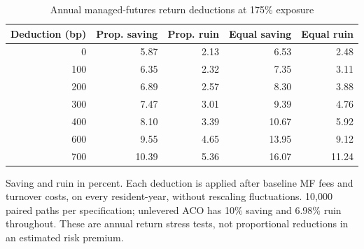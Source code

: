 \begin{table}[htbp]\centering\small
\caption{Annual managed-futures return deductions at 175\% exposure}\label{tab:review-mf}
\begin{tabular}{rrrrr}\toprule
Deduction (bp) & Prop. saving & Prop. ruin & Equal saving & Equal ruin \\
\midrule
0 & 5.87 & 2.13 & 6.53 & 2.48 \\
100 & 6.35 & 2.32 & 7.35 & 3.11 \\
200 & 6.89 & 2.57 & 8.30 & 3.88 \\
300 & 7.47 & 3.01 & 9.39 & 4.76 \\
400 & 8.10 & 3.39 & 10.67 & 5.92 \\
600 & 9.55 & 4.65 & 13.95 & 9.12 \\
700 & 10.39 & 5.36 & 16.07 & 11.24 \\
\bottomrule\end{tabular}
\par\smallskip\begin{minipage}{0.96\textwidth}\footnotesize
Saving and ruin in percent. Each deduction is applied after baseline MF fees and turnover costs, on every resident-year, without rescaling fluctuations. 10,000 paired paths per specification; unlevered ACO has 10\% saving and 6.98\% ruin throughout. These are annual return stress tests, not proportional reductions in an estimated risk premium.
\end{minipage}\end{table}
